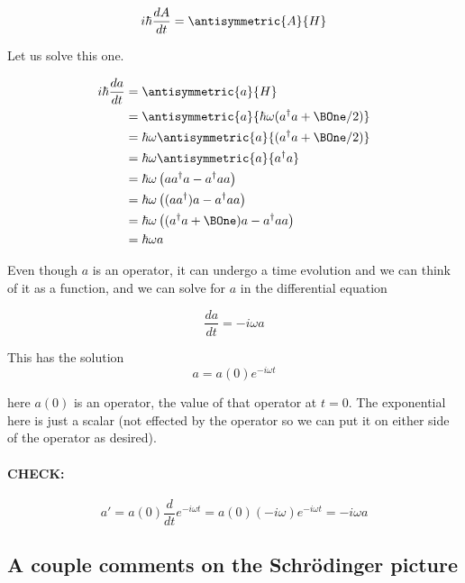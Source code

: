 \begin{equation}\label{eqn:PHY356FLecture11:270}
i \hbar \frac{d A}{dt} = \antisymmetric{ A }{H}
\end{equation}

Let us solve this one.

\begin{align*}
i \hbar \frac{d a}{dt}
&= \antisymmetric{ a }{H} \\
&= \antisymmetric{ a }{ \hbar \omega (a^\dagger a + \BOne/2) } \\
&= \hbar\omega \antisymmetric{ a }{ (a^\dagger a + \BOne/2) } \\
&= \hbar\omega \antisymmetric{ a }{ a^\dagger a } \\
&= \hbar\omega \left( a a^\dagger a - a^\dagger a a \right) \\
&= \hbar\omega \left( (a a^\dagger) a - a^\dagger a a \right) \\
&= \hbar\omega \left( (a^\dagger a + \BOne) a - a^\dagger a a \right) \\
&= \hbar\omega a
\end{align*}

Even though $a$ is an operator, it can undergo a time evolution and we can think of it as a function, and we can solve for $a$ in the differential equation

\begin{equation}\label{eqn:PHY356FLecture11:280}
\frac{d a}{dt} = -i \omega a
\end{equation}

This has the solution
\begin{equation}\label{eqn:PHY356FLecture11:290}
a = a(0) e^{-i \omega t}
\end{equation}

here $a(0)$ is an operator, the value of that operator at $t = 0$.  The exponential here is just a scalar (not effected by the operator so we can put it on either side of the operator as desired).

\paragraph{CHECK:}
\begin{equation}\label{eqn:PHY356FLecture11:291}
a' = a(0) \frac{d}{dt} e^{-i \omega t} = a(0) (-i \omega) e^{-i \omega t} = -i \omega a
\end{equation}

\subsection{A couple comments on the Schr\"{o}dinger picture}

